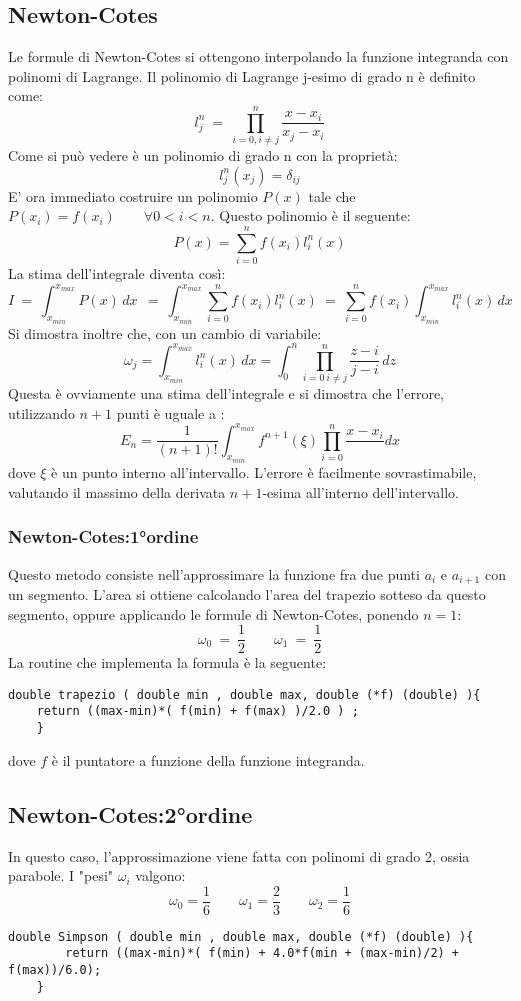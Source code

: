 \subsection*{Newton-Cotes}
Le formule di Newton-Cotes si ottengono interpolando la funzione integranda con polinomi di Lagrange.
Il polinomio di Lagrange j-esimo di grado n è definito come:
$$
	l_j^n \ = \ \prod_{i = 0, i \ne j}^{n} \frac{x-x_i}{x_j - x_i}
$$
	Come si può vedere è un polinomio di grado n con la proprietà:
$$
	l_j^n ( x_j) = \delta_{ij}
$$
E' ora immediato costruire un polinomio $P(x)$ tale che $ P(x_i) = f(x_i) \qquad \forall  0<i<n$.
Questo polinomio è il seguente:
$$
	P(x) = \sum_{i = 0}^n f(x_i) l_i^n(x)
$$
La stima dell'integrale diventa così:
$$
 I \ = \ \int_{x_{min}}^{x_{max}} P(x) \, dx \ \ = \ \int_{x_{min}}^{x_{max}} \sum_{i = 0}^n f(x_i) l_i^n(x)  \ =  \ \sum_{i = 0}^n f(x_i) \int_{x_{min}}^{x_{max}} l_i^n(x) \,dx 
$$
 Si dimostra inoltre che, con un cambio di variabile:
 $$
 \omega_j = \int_{x_{min}}^{x_{max}} l_i^n(x) \,dx  = \int_{0}^{n} \prod_{i = 0 \ i \ne j}^n \frac{z-i}{j-i}\,dz 
$$
Questa è ovviamente una stima dell'integrale e si dimostra che l'errore, utilizzando $n+1$ punti è uguale a :
$$
 E_n = \frac{1}{(n+1)!} \int_{x_{min}}^{x_{max}} f^{n+1}(\xi) \prod_{i = 0}^n \frac{x-x_i} \, dx
$$
dove $\xi$ è un punto interno all'intervallo. L'errore è facilmente sovrastimabile, valutando il massimo della derivata $n+1$-esima all'interno dell'intervallo.
\subsubsection*{Newton-Cotes:1°ordine}
Questo metodo consiste nell'approssimare la funzione fra due punti $a_i$ e $a_{i+1}$ con un segmento.
L'area si ottiene calcolando l'area del trapezio sotteso da questo segmento, oppure applicando le formule di Newton-Cotes, ponendo $ n = 1$: 
$$
\omega_0 \ = \ \frac{1}{2} \qquad \omega_1 \ = \ \frac{1}{2}
$$
La routine che implementa la formula è la seguente:
\begin{verbatim}
double trapezio ( double min , double max, double (*f) (double) ){
	return ((max-min)*( f(min) + f(max) )/2.0 ) ;
	}
\end{verbatim}
dove $f$ è il puntatore a funzione della funzione integranda.

\subsection*{Newton-Cotes:2°ordine}
In questo caso, l'approssimazione viene fatta con polinomi di grado 2, ossia parabole.
I "pesi" $\omega_i$ valgono:
$$
	\omega_0 = \frac{1}{6} \qquad  \omega_1 = \frac{2}{3} \qquad \omega_2 = \frac{1}{6}
$$
\begin{verbatim}
double Simpson ( double min , double max, double (*f) (double) ){
		return ((max-min)*( f(min) + 4.0*f(min + (max-min)/2) + f(max))/6.0);
	}
\end{verbatim}

